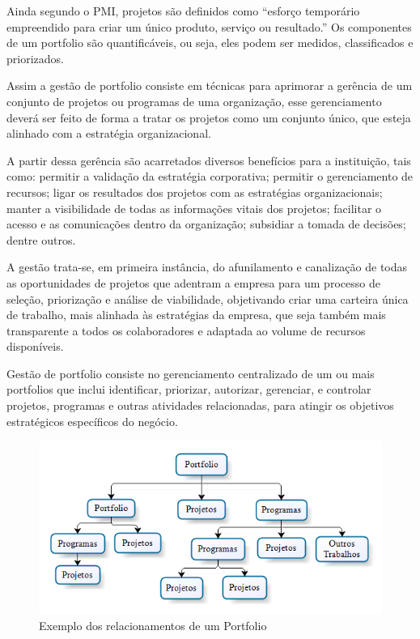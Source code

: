 \documentclass[12pt,a4paper,ruledheader,tocpage=prefix,floatnumber=continuous,pagestart=folhaderosto,font=times]{abnt}
\begin{document}
Ainda segundo o PMI, projetos são definidos como ``esforço temporário empreendido para criar um único produto, serviço ou resultado.'' Os componentes de 
um portfolio são quantificáveis, ou seja, eles podem ser medidos, classificados e priorizados\cite{SPPM2008}.

Assim a gestão de portfolio consiste em técnicas para aprimorar a gerência de um conjunto de projetos ou programas de uma organização, esse gerenciamento
deverá ser feito de forma a tratar os projetos como um conjunto único, que esteja alinhado com a estratégia organizacional. 

A partir dessa gerência são acarretados diversos  benefícios para a instituição, tais como: permitir a validação da estratégia corporativa; 
permitir o gerenciamento de recursos; ligar os resultados dos projetos com as estratégias organizacionais; manter a visibilidade de todas as 
informações vitais dos projetos; facilitar o acesso e as comunicações dentro da organização; subsidiar a tomada de decisões; dentre outros. 

A gestão trata-se, em primeira instância, do afunilamento e canalização de todas as oportunidades de projetos que adentram a empresa para um processo de 
seleção, priorização e análise de viabilidade, objetivando criar uma carteira única de trabalho, mais alinhada às estratégias da empresa, que seja 
também mais transparente a todos os colaboradores e adaptada ao volume de recursos disponíveis.

Gestão de portfolio consiste no gerenciamento centralizado de um ou mais portfolios  que inclui identificar, priorizar, autorizar, gerenciar, e 
controlar projetos, programas e outras atividades relacionadas, para atingir os objetivos estratégicos específicos do negócio\cite{SOFTEX2007}.

\begin{figure}[H]
\centering
\includegraphics[width=.7\textwidth]{img/fig3.png}
\caption{Exemplo dos relacionamentos de um Portfolio}
\end{figure} 
\end{document}
